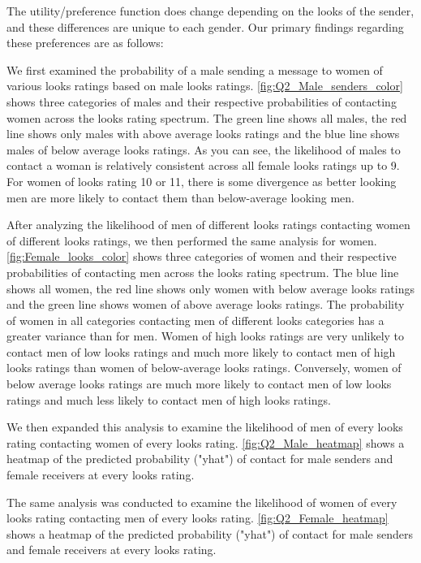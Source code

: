 The utility/preference function does change depending on the looks of the sender, and these differences are unique to each gender.  Our primary findings regarding these preferences are as follows:

We first examined the probability of a male sending a message to women of various looks ratings based on male looks ratings. \vref{fig:Q2_Male_senders_color} shows three categories of males and their respective probabilities of contacting women across the looks rating spectrum.  The green line shows all males, the red line shows only males with above average looks ratings and the blue line shows males of below average looks ratings.  As you can see, the likelihood of males to contact a woman is relatively consistent across all female looks ratings up to 9.  For women of looks rating 10 or 11, there is some divergence as better looking men are more likely to contact them than below-average looking men.  

After analyzing the likelihood of men of different looks ratings contacting women of different looks ratings, we then performed the same analysis for women. \vref{fig:Female_looks_color} shows three categories of women and their respective probabilities of contacting men across the looks rating spectrum. The blue line shows all women, the red line shows only women with below average looks ratings and the green line shows women of above average looks ratings.  The probability of women in all categories contacting men of different looks categories has a greater variance than for men.  Women of high looks ratings are very unlikely to contact men of low looks ratings and much more likely to contact men of high looks ratings than women of below-average looks ratings.  Conversely, women of below average looks ratings are much more likely to contact men of low looks ratings and much less likely to contact men of high looks ratings. 



We then expanded this analysis to examine the likelihood of men of every looks rating contacting women of every looks rating.  \vref{fig:Q2_Male_heatmap} shows a heatmap of the predicted probability ("yhat") of contact for male senders and female receivers at every looks rating.

The same analysis was conducted to examine the likelihood of women of every looks rating contacting men of every looks rating.  \vref{fig:Q2_Female_heatmap} shows a heatmap of the predicted probability ("yhat") of contact for male senders and female receivers at every looks rating.

